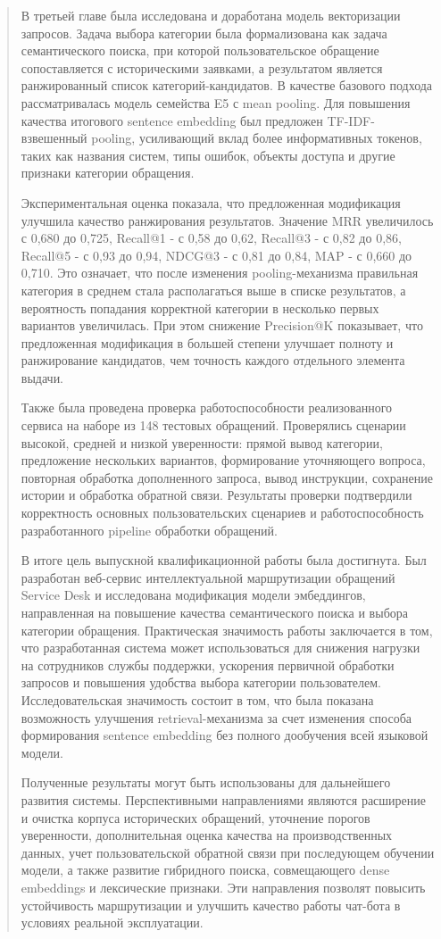 \begin{quote}
В третьей главе была исследована и доработана модель векторизации
запросов. Задача выбора категории была формализована как задача
семантического поиска, при которой пользовательское обращение
сопоставляется с историческими заявками, а результатом является
ранжированный список категорий-кандидатов. В качестве базового подхода
рассматривалась модель семейства E5 с mean pooling. Для повышения
качества итогового sentence embedding был предложен TF-IDF-взвешенный
pooling, усиливающий вклад более информативных токенов, таких как
названия систем, типы ошибок, объекты доступа и другие признаки
категории обращения.

Экспериментальная оценка показала, что предложенная модификация улучшила
качество ранжирования результатов. Значение MRR увеличилось с 0,680 до
0,725, Recall@1 - с 0,58 до 0,62, Recall@3 - с 0,82 до 0,86, Recall@5 -
с 0,93 до 0,94, NDCG@3 - с 0,81 до 0,84, MAP - с 0,660 до 0,710. Это
означает, что после изменения pooling-механизма правильная категория в
среднем стала располагаться выше в списке результатов, а вероятность
попадания корректной категории в несколько первых вариантов увеличилась.
При этом снижение Precision@K показывает, что предложенная модификация в
большей степени улучшает полноту и ранжирование кандидатов, чем точность
каждого отдельного элемента выдачи.

Также была проведена проверка работоспособности реализованного сервиса
на наборе из 148 тестовых обращений. Проверялись сценарии высокой,
средней и низкой уверенности: прямой вывод категории, предложение
нескольких вариантов, формирование уточняющего вопроса, повторная
обработка дополненного запроса, вывод инструкции, сохранение истории и
обработка обратной связи. Результаты проверки подтвердили корректность
основных пользовательских сценариев и работоспособность разработанного
pipeline обработки обращений.

В итоге цель выпускной квалификационной работы была достигнута. Был
разработан веб-сервис интеллектуальной маршрутизации обращений Service
Desk и исследована модификация модели эмбеддингов, направленная на
повышение качества семантического поиска и выбора категории обращения.
Практическая значимость работы заключается в том, что разработанная
система может использоваться для снижения нагрузки на сотрудников службы
поддержки, ускорения первичной обработки запросов и повышения удобства
выбора категории пользователем. Исследовательская значимость состоит в
том, что была показана возможность улучшения retrieval-механизма за счет
изменения способа формирования sentence embedding без полного дообучения
всей языковой модели.

Полученные результаты могут быть использованы для дальнейшего развития
системы. Перспективными направлениями являются расширение и очистка
корпуса исторических обращений, уточнение порогов уверенности,
дополнительная оценка качества на производственных данных, учет
пользовательской обратной связи при последующем обучении модели, а также
развитие гибридного поиска, совмещающего dense embeddings и лексические
признаки. Эти направления позволят повысить устойчивость маршрутизации и
улучшить качество работы чат-бота в условиях реальной эксплуатации.
\end{quote}

